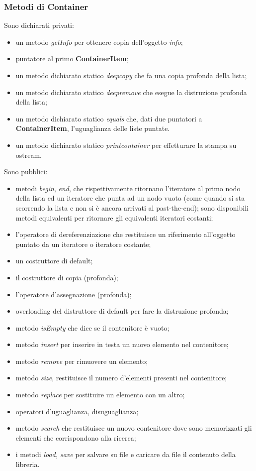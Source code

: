 {{			\subsubsection*{Metodi di Container}{
		Sono dichiarati privati:
			\begin{itemize}\itemsep=0.3pt
				\item un metodo \textit{getInfo} per ottenere copia dell'oggetto \textit{info};
				\item puntatore al primo \textbf{ContainerItem};
				\item un metodo dichiarato statico \textit{deepcopy} che fa una copia profonda della lista;
				\item un metodo dichiarato statico \textit{deepremove} che esegue la distruzione profonda della lista;
				\item un metodo dichiarato statico \textit{equals} che, dati due puntatori a \textbf{ContainerItem}, l'uguaglianza delle liste puntate.
				\item un metodo dichiarato statico \textit{printcontainer} per effetturare la stampa su ostream.
			\end{itemize}
			Sono pubblici:
			\begin{itemize}\itemsep=0.3pt
				\item metodi \textit{begin}, \textit{end}, che rispettivamente ritornano l'iteratore al primo nodo della lista ed un iteratore che punta ad un nodo vuoto (come quando si sta scorrendo la lista e non si è ancora arrivati al past-the-end); sono disponibili metodi equivalenti per ritornare gli equivalenti iteratori costanti;
				\item l'operatore di dereferenziazione che restituisce un riferimento all'oggetto puntato da un iteratore o iteratore costante;
				\item un costruttore di default;
				\item il costruttore di copia (profonda);
				\item l'operatore d'assegnazione (profonda);
				\item overloading del distruttore di default per fare la distruzione profonda;
				\item metodo \textit{isEmpty} che dice se il contenitore è vuoto;
				\item metodo \textit{insert} per inserire in testa un nuovo elemento nel contenitore;
				\item metodo \textit{remove} per rimuovere un elemento;
				\item metodo \textit{size}, restituisce il numero d'elementi presenti nel contenitore;
				\item metodo \textit{replace} per sostituire un elemento con un altro;
				\item operatori d'uguaglianza, disuguaglianza;
				\item metodo \textit{search} che restituisce un nuovo contenitore dove sono memorizzati gli elementi che corrispondono alla ricerca;
				\item i metodi \textit{load, save} per salvare su file e caricare da file il contenuto della libreria.
			\end{itemize}
			}
		}
}
